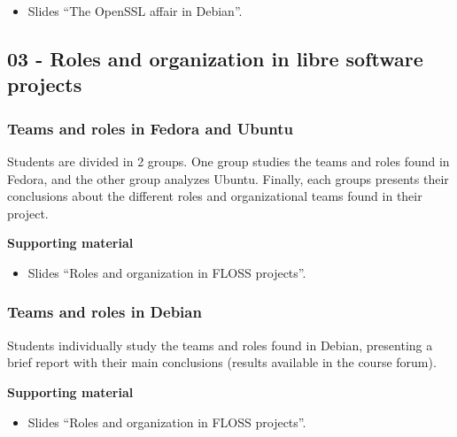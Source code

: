 \documentclass[a4paper]{article}
\begin{document}
\begin{itemize}
\item Slides ``The OpenSSL affair in Debian''.
\end{itemize}

\subsection{03 - Roles and organization in libre software projects}


\subsubsection{Teams and roles in Fedora and Ubuntu}
\label{sub:roles-debian}

Students are divided in 2 groups. One group studies the teams and roles found in Fedora, and the other group analyzes Ubuntu. Finally, each groups
presents their conclusions about the different roles and organizational teams found in their project.

\textbf{Supporting material}

\begin{itemize}
\item Slides ``Roles and organization in FLOSS projects''.
\end{itemize}

\subsubsection{Teams and roles in Debian}
\label{sub:roles-debian}

Students individually study the teams and roles found in Debian, presenting a brief report with their main conclusions (results available in the course forum).

\textbf{Supporting material}

\begin{itemize}
\item Slides ``Roles and organization in FLOSS projects''.
\end{itemize}
\end{document}

